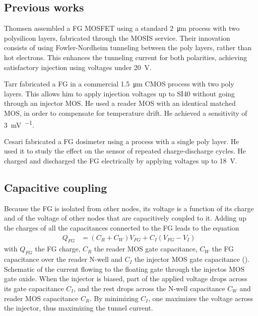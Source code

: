 \subsection{Previous works}
Thomsen\cite{thomsen_floating-gate_1991} assembled a FG MOSFET
using a standard \SI{2}{\micro\meter} process with two polysilicon layers,
fabricated through the MOSIS service\cite{noauthor_mosis_nodate}.
Their innovation consists of using Fowler-Nordheim tunneling between the poly layers,
rather than hot electrons.
This enhances the tunneling current for both polarities,
achieving satisfactory injection using voltages under \SI{20}{\volt}.

Tarr\cite{tarr_sensitive_2004} fabricated a FG in a commercial
\SI{1.5}{\micro\meter} CMOS process with two poly layers.
This allows him to apply injection voltages up to SI{40}{\volt}
without going through an injector MOS.
He used a reader MOS with an identical matched MOS,
in order to compensate for temperature drift.
He achieved a sensitivity of \SI{3}{\milli\volt\per\rad}.

Cesari\cite{cesari_floating_2014} fabricated a FG dosimeter
using a process with a single poly layer.
He used it to study the effect on the sensor of repeated charge-discharge cycles.
He charged and discharged the FG electrically by applying voltages up to
\SI{18}{\volt}.

%
\subsection{Capacitive coupling}
Because the FG is isolated from other nodes,
its voltage is a function of its charge and of the voltage of other nodes that are capacitively coupled to it.
Adding up the charges of all the capacitances connected to the FG leads to the equation
\begin{align}
    Q_{FG} &= (C_R + C_W) V_{FG} + C_I (V_{FG}-V_I)
    \label{eq:ccoupling}
\end{align}
with $Q_{FG}$ the FG charge, $C_R$ the reader MOS gate capacitance,
$C_W$ the FG capacitance over the reader N-well and 
$C_I$ the injector MOS gate capacitance ().
{Schematic of the current flowing to the floating gate through the injectos MOS gate oxide.
When the injector is biased, part of the applied voltage drops across its gate capacitance $C_I$,
and the rest drops across the N-well capacitance $C_W$ and reader MOS capacitance $C_R$.
By minimizing $C_I$, one maximizes the voltage across the injector,
thus maximizing the tunnel current.}

